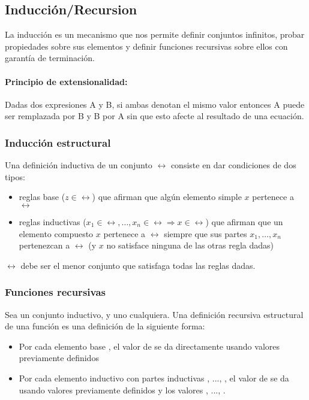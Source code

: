 \subsection{Inducción/Recursion}

La inducción es un mecanismo que nos permite definir conjuntos infinitos, probar propiedades sobre sus elementos y definir funciones recursivas sobre ellos con garantía de terminación.

\paragraph{Principio de extensionalidad:} Dadas dos expresiones A y B, si ambas denotan el mismo valor entonces A puede ser remplazada por B y B por A sin que esto afecte al resultado de una ecuación.

\subsubsection{Inducción estructural}
Una definición inductiva de un conjunto $\rel$ consiste en dar condiciones de dos tipos:
\begin{itemize}
	\item reglas base ($z\in\rel$) que afirman que algún elemento simple $x$ pertenece a $\rel$
	\item reglas inductivas ($x_1\in\rel,\dots,x_n\in\rel\Rightarrow x\in\rel$) que afirman que un elemento compuesto $x$ pertenece a
	$\rel$ siempre que sus partes $x_1,\dots,x_n$ pertenezcan a $\rel$
	(y $x$ no satisface ninguna de las otras regla dadas)
\end{itemize}

$\rel$ debe ser el menor conjunto que satisfaga todas las reglas dadas.

\subsubsection{Funciones recursivas}
Sea  un conjunto inductivo, y  uno cualquiera. Una definición recursiva estructural de una función  es una definición de la siguiente forma:
\begin{itemize}
	\item Por cada elemento base , el valor de  se da directamente usando valores previamente definidos
	\item Por cada elemento inductivo  con partes inductivas , ..., , el valor de  se da usando valores previamente definidos y los valores , ..., .
\end{itemize}

